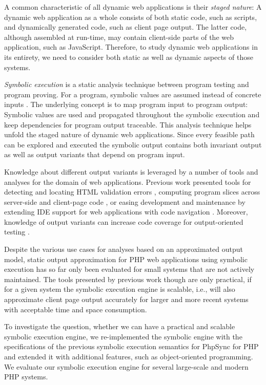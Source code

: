 \documentclass[sigconf, preprint]{acmart}
\renewcommand{\sf}[1]{\textsf{#1}}
\begin{document}
A common characteristic of all dynamic web applications is their
\emph{staged nature}: A dynamic web application as a whole
consists of both static code, such as scripts, and dynamically generated code,
such as client page output. The latter code, although assembled at
run-time, may contain client-side parts of the web application, such as
JavaScript. Therefore, to study dynamic web applications in its entirety, we
need to consider both static as well as dynamic aspects of those systems.

\emph{Symbolic execution} is a static analysis technique between program testing
and program proving. For a program, symbolic values are
assumed instead of concrete inputs \cite{Darringer1978,King1976}. The underlying
concept is to map program input to program output: Symbolic values are used and
propagated throughout the symbolic execution and keep dependencies for program
output traceable. This analysis technique helps unfold the staged nature
of dynamic web applications. Since every feasible path can be explored
and executed the symbolic output contains both invariant output as well as
output variants that depend on program input.

Knowledge about different output variants is leveraged by a number of
tools and analyses for the domain of web applications. Previous work presented
tools for detecting and locating HTML validation errors
\cite{Nguyen:2011:AFH:2190078.2190142}, computing program slices across
server-side and client-page code \cite{Nguyen:2015:CPS:2786805.2786872}, or
easing development and maintenance by extending IDE support for web applications
with code navigation \cite{Nguyen:2015:VIS:2819009.2819140,Nguyen:2014:BCG:2635868.2635928}.
Moreover, knowledge of output variants can increase code coverage for
output-oriented testing \cite{Alshahwan2011}.

Despite the various use cases for analyses based on an approximated output
model, static output approximation for PHP web applications using symbolic
execution has so far only been evaluated for small systems that are not
actively maintained. The tools presented by previous work
\cite{Nguyen:2015:VIS:2819009.2819140,Nguyen:2014:BCG:2635868.2635928,Nguyen:2015:CPS:2786805.2786872,Nguyen:2011:AFH:2190078.2190142}
though are only practical, if for a given system the symbolic execution engine
is scalable, i.e., will also approximate client page output accurately for
larger and more recent systems with acceptable time and space consumption.

To investigate the question, whether we can have a practical and scalable
symbolic execution engine, we re-implemented the symbolic engine with the
specifications of the previous symbolic execution semantics
for \sf{PhpSync} \cite{Nguyen:2014:BCG:2635868.2635928} for PHP and
extended it with additional features, such as object-oriented programming. We
evaluate our symbolic execution engine for several large-scale and modern PHP systems.
\end{document}

